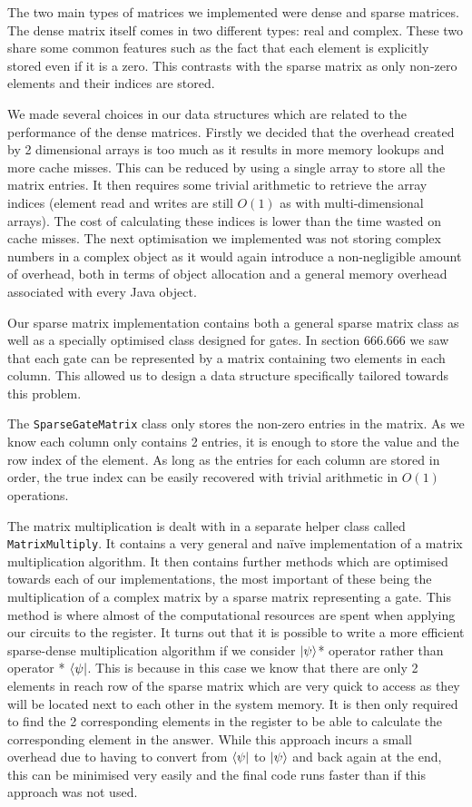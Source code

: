 \documentclass[bibliography=totocnumbered, 10pt]{article}
\theoremstyle{NoticeStyle}
\begin{document}
The two main types of matrices we implemented were dense and sparse matrices. The dense matrix itself comes in two different types: real and complex. These two share some common features such as the fact that each element is explicitly stored even if it is a zero. This contrasts with the sparse matrix as only non-zero elements and their indices are stored.

We made several choices in our data structures which are related to the performance of the dense matrices. Firstly we decided that the overhead created by 2 dimensional arrays is too much as it results in more memory lookups and more cache misses. This can be reduced by using a single array to store all the matrix entries. It then requires some trivial arithmetic to retrieve the array indices (element read and writes are still $O(1)$ as with multi-dimensional arrays). The cost of calculating these indices is lower than the time wasted on cache misses. 
The next optimisation we implemented was not storing complex numbers in a complex object as it would again introduce a non-negligible amount of overhead, both in terms of object allocation and a general memory overhead associated with every Java object.

Our sparse matrix implementation contains both a general sparse matrix class as well as a specially optimised class designed for gates. In section 666.666 we saw that each gate can be represented by a matrix containing two elements in each column. This allowed us to design a data structure specifically tailored towards this problem.

The \texttt{SparseGateMatrix} class only stores the non-zero entries in the matrix. As we know each column only contains 2 entries, it is enough to store the value and the row index of the element. As long as the entries for each column are stored in order, the true index can be easily recovered with trivial arithmetic in $O(1)$ operations.

The matrix multiplication is dealt with in a separate helper class called \texttt{MatrixMultiply}. It contains a very general and naïve implementation of a matrix multiplication algorithm. It then contains further methods which are optimised towards each of our implementations, the most important of these being the multiplication of a complex matrix by a sparse matrix representing a gate. This method is where almost of the computational resources are spent when applying our circuits to the register. It turns out that it is possible to write a more efficient sparse-dense multiplication algorithm if we consider ${\left\vert{\psi}\right\rangle}$* operator rather than operator * ${\left\langle{\psi}\right\vert}$. This is because in this case we know that there are only 2 elements in reach row of the sparse matrix which are very quick to access as they will be located next to each other in the system memory. It is then only required to find the 2 corresponding elements in the register to be able to calculate the corresponding element in the answer. While this approach incurs a small overhead due to having to convert from ${\left\langle{\psi}\right\vert}$ to ${\left\vert{\psi}\right\rangle}$ and back again at the end, this can be minimised very easily and the final code runs faster than if this approach was not used.
\end{document}
